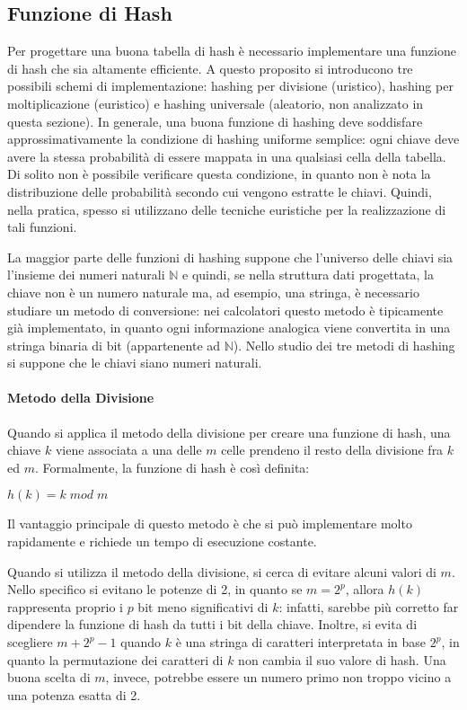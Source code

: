 \subsection{Funzione di Hash}
Per progettare una buona tabella di hash è necessario implementare una funzione di hash che sia altamente efficiente. A questo proposito si introducono tre possibili schemi di implementazione: hashing per divisione (uristico), hashing per moltiplicazione (euristico) e hashing universale (aleatorio, non analizzato in questa sezione). In generale, una buona funzione di hashing deve soddisfare approssimativamente la condizione di hashing uniforme semplice: ogni chiave deve avere la stessa probabilità di essere mappata in una qualsiasi cella della tabella. Di solito non è possibile verificare questa condizione, in quanto non è nota la distribuzione delle probabilità secondo cui vengono estratte le chiavi. Quindi, nella pratica, spesso si utilizzano delle tecniche euristiche per la realizzazione di tali funzioni.

La maggior parte delle funzioni di hashing suppone che l'universo delle chiavi sia l'insieme dei numeri naturali \(\mathbb{N}\) e quindi, se nella struttura dati progettata, la chiave non è un numero naturale ma, ad esempio, una stringa, è necessario studiare un metodo di conversione: nei calcolatori questo metodo è tipicamente già implementato, in quanto ogni informazione analogica viene convertita in una stringa binaria di bit (appartenente ad \(\mathbb{N}\)). Nello studio dei tre metodi di hashing si suppone che le chiavi siano numeri naturali.

\paragraph{Metodo della Divisione} Quando si applica il metodo della divisione per creare una funzione di hash, una chiave \(k\) viene associata a una delle \(m\) celle prendeno il resto della divisione fra \(k\) ed \(m\). Formalmente, la funzione di hash è così definita:

\(h(k)=k\; mod\; m\)

\noindent Il vantaggio principale di questo metodo è che si può implementare molto rapidamente e richiede un tempo di esecuzione costante. 

Quando si utilizza il metodo della divisione, si cerca di evitare alcuni valori di \(m\). Nello specifico si evitano le potenze di 2, in quanto se \(m=2^p\), allora \(h(k)\) rappresenta proprio i \(p\) bit meno significativi di \(k\): infatti, sarebbe più corretto far dipendere la funzione di hash da tutti i bit della chiave. Inoltre, si evita di scegliere \(m+2^p-1\) quando \(k\) è una stringa di caratteri interpretata in base \(2^p\), in quanto la permutazione dei caratteri di \(k\) non cambia il suo valore di hash. Una buona scelta di \(m\), invece, potrebbe essere un numero primo non troppo vicino a una potenza esatta di 2.

